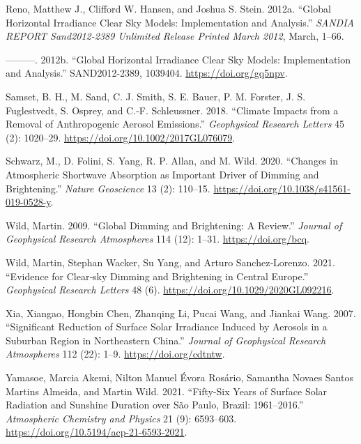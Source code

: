 \documentclass[
  preprint, 3p, authoryear]{article}
\newlength{\cslhangindent}
\newlength{\cslentryspacingunit} %
\newenvironment{CSLReferences}[2] %
 {%
  \setlength{\parindent}{0pt}
  \ifodd #1
  \let\oldpar\par
  \def\par{\hangindent=\cslhangindent\oldpar}
  \fi
  \setlength{\parskip}{#2\cslentryspacingunit}
 }%
 {}
\begin{document}
\begin{CSLReferences}{1}{0}
\leavevmode{}%
Reno, Matthew J., Clifford W. Hansen, and Joshua S. Stein. 2012a. {``{Global Horizontal Irradiance Clear Sky Models: Implementation and Analysis}.''} \emph{SANDIA REPORT Sand2012-2389 Unlimited Release Printed March 2012}, March, 1--66.

\leavevmode{}%
---------. 2012b. {``Global Horizontal Irradiance Clear Sky Models: Implementation and Analysis.''} SAND2012-2389, 1039404. \url{https://doi.org/gq5npv}.

\leavevmode{}%
Samset, B. H., M. Sand, C. J. Smith, S. E. Bauer, P. M. Forster, J. S. Fuglestvedt, S. Osprey, and C.‐F. Schleussner. 2018. {``Climate Impacts from a Removal of Anthropogenic Aerosol Emissions.''} \emph{Geophysical Research Letters} 45 (2): 1020--29. \url{https://doi.org/10.1002/2017GL076079}.

\leavevmode{}%
Schwarz, M., D. Folini, S. Yang, R. P. Allan, and M. Wild. 2020. {``Changes in Atmospheric Shortwave Absorption as Important Driver of Dimming and Brightening.''} \emph{Nature Geoscience} 13 (2): 110--15. \url{https://doi.org/10.1038/s41561-019-0528-y}.

\leavevmode{}%
Wild, Martin. 2009. {``Global Dimming and Brightening: A Review.''} \emph{Journal of Geophysical Research Atmospheres} 114 (12): 1--31. \url{https://doi.org/bcq}.

\leavevmode{}%
Wild, Martin, Stephan Wacker, Su Yang, and Arturo Sanchez‐Lorenzo. 2021. {``Evidence for Clear‐sky Dimming and Brightening in Central Europe.''} \emph{Geophysical Research Letters} 48 (6). \url{https://doi.org/10.1029/2020GL092216}.

\leavevmode{}%
Xia, Xiangao, Hongbin Chen, Zhanqing Li, Pucai Wang, and Jiankai Wang. 2007. {``Significant Reduction of Surface Solar Irradiance Induced by Aerosols in a Suburban Region in Northeastern China.''} \emph{Journal of Geophysical Research Atmospheres} 112 (22): 1--9. \url{https://doi.org/cdtntw}.

\leavevmode{}%
Yamasoe, Marcia Akemi, Nilton Manuel Évora Rosário, Samantha Novaes Santos Martins Almeida, and Martin Wild. 2021. {``Fifty-Six Years of Surface Solar Radiation and Sunshine Duration over São Paulo, Brazil: 1961--2016.''} \emph{Atmospheric Chemistry and Physics} 21 (9): 6593--603. \url{https://doi.org/10.5194/acp-21-6593-2021}.


\end{CSLReferences}
\end{document}
